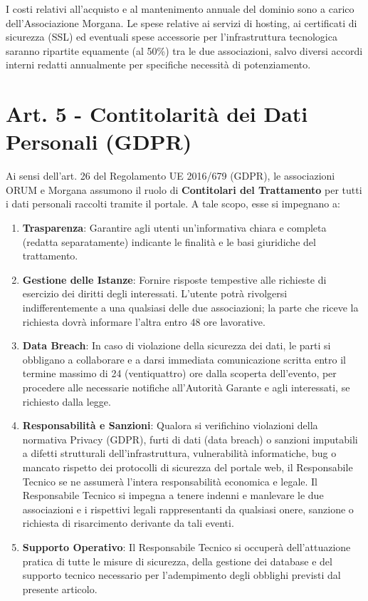 \documentclass[a4paper,11pt]{article}
\begin{document}
I costi relativi all'acquisto e al mantenimento annuale del dominio sono a carico dell'Associazione Morgana. Le spese relative ai servizi di hosting, ai certificati di sicurezza (SSL) ed eventuali spese accessorie per l'infrastruttura tecnologica saranno ripartite equamente (al 50\%) tra le due associazioni, salvo diversi accordi interni redatti annualmente per specifiche necessità di potenziamento.

\section*{Art. 5 - Contitolarità dei Dati Personali (GDPR)}

Ai sensi dell'art. 26 del Regolamento UE 2016/679 (GDPR), le associazioni ORUM e Morgana assumono il ruolo di \textbf{Contitolari del Trattamento} per tutti i dati personali raccolti tramite il portale. A tale scopo, esse si impegnano a:
\begin{enumerate}[leftmargin=*]
    \item \textbf{Trasparenza}: Garantire agli utenti un'informativa chiara e completa (redatta separatamente) indicante le finalità e le basi giuridiche del trattamento.
    \item \textbf{Gestione delle Istanze}: Fornire risposte tempestive alle richieste di esercizio dei diritti degli interessati. L'utente potrà rivolgersi indifferentemente a una qualsiasi delle due associazioni; la parte che riceve la richiesta dovrà informare l'altra entro 48 ore lavorative.
    \item \textbf{Data Breach}: In caso di violazione della sicurezza dei dati, le parti si obbligano a collaborare e a darsi immediata comunicazione scritta entro il termine massimo di 24 (ventiquattro) ore dalla scoperta dell'evento, per procedere alle necessarie notifiche all'Autorità Garante e agli interessati, se richiesto dalla legge.
    \item \textbf{Responsabilità e Sanzioni}: Qualora si verifichino violazioni della normativa Privacy (GDPR), furti di dati (data breach) o sanzioni imputabili a difetti strutturali dell'infrastruttura, vulnerabilità informatiche, bug o mancato rispetto dei protocolli di sicurezza del portale web, il Responsabile Tecnico se ne assumerà l'intera responsabilità economica e legale. Il Responsabile Tecnico si impegna a tenere indenni e manlevare le due associazioni e i rispettivi legali rappresentanti da qualsiasi onere, sanzione o richiesta di risarcimento derivante da tali eventi.
    \item \textbf{Supporto Operativo}: Il Responsabile Tecnico si occuperà dell'attuazione pratica di tutte le misure di sicurezza, della gestione dei database e del supporto tecnico necessario per l'adempimento degli obblighi previsti dal presente articolo.
\end{enumerate}
\end{document}

